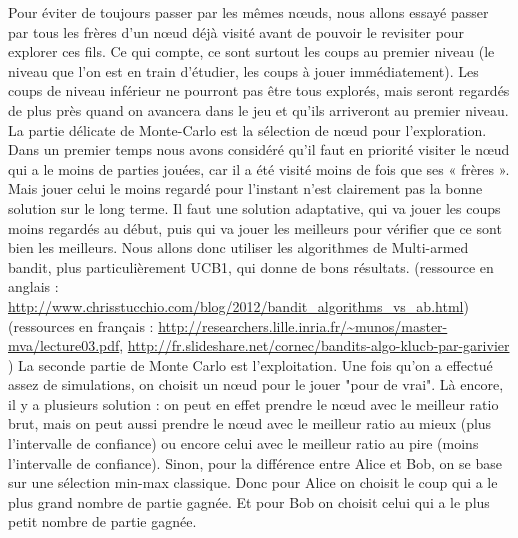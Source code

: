 Pour éviter de toujours passer par les mêmes nœuds, nous allons essayé passer par tous les frères d’un nœud déjà visité avant de pouvoir le revisiter pour explorer ces fils. Ce qui compte, ce sont surtout les coups au premier niveau (le niveau que l’on est en train d’étudier, les coups à jouer immédiatement). Les coups de niveau inférieur ne pourront pas être tous explorés, mais seront regardés de plus près quand on avancera dans le jeu et qu'ils arriveront au premier niveau.
La partie délicate de Monte-Carlo est la sélection de nœud pour l'exploration. Dans un premier temps nous avons considéré  qu’il faut en priorité visiter le nœud qui a le moins de parties jouées, car il a été visité moins de fois que ses « frères ». Mais jouer celui le moins regardé pour l'instant n'est clairement pas la bonne solution sur le long terme. Il faut une solution adaptative, qui va jouer les coups moins regardés au début, puis qui va jouer les meilleurs pour vérifier que ce sont bien les meilleurs. Nous allons donc utiliser les algorithmes de Multi-armed bandit, plus particulièrement UCB1, qui donne de bons résultats.
(ressource en anglais : \url{http://www.chrisstucchio.com/blog/2012/bandit_algorithms_vs_ab.html})
(ressources en français : \url{http://researchers.lille.inria.fr/~munos/master-mva/lecture03.pdf}, \url{http://fr.slideshare.net/cornec/bandits-algo-klucb-par-garivier} )
La seconde partie de Monte Carlo est l'exploitation. Une fois qu'on a effectué assez de simulations, on choisit un nœud pour le jouer "pour de vrai". Là encore, il y a plusieurs solution : on peut en effet prendre le nœud avec le meilleur ratio brut, mais on peut aussi prendre le nœud avec le meilleur ratio au mieux (plus l'intervalle de confiance) ou encore celui avec le meilleur ratio au pire (moins l'intervalle de confiance). 
Sinon, pour la différence entre Alice et Bob, on se base sur une sélection min-max classique. Donc pour Alice on choisit le coup qui a le plus grand nombre de partie gagnée. Et pour Bob on choisit celui qui a le plus petit nombre de partie gagnée. 
